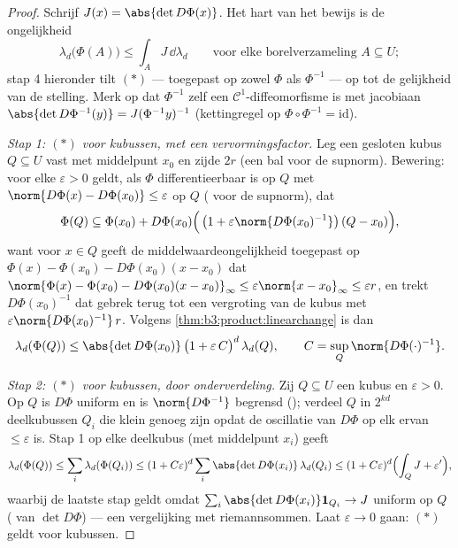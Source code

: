 \begin{proof}
Schrijf $J(x) = \abs{\det D\Phi(x)}$. Het hart van het bewijs is
de ongelijkheid
\[
\lambda_d\bigl(\Phi(A)\bigr) \leq \int_A J\,\dd\lambda_d
\qquad\text{voor elke borelverzameling } A \subseteq U;
\tag{$*$}
\]
stap 4 hieronder tilt $(*)$ --- toegepast op zowel $\Phi$ als
$\Phi^{-1}$ --- op tot de gelijkheid van de stelling. Merk op dat
$\Phi^{-1}$ zelf een $\mathcal C^1$-diffeomorfisme is met
jacobiaan $\abs{\det D\Phi^{-1}(y)} = J(\Phi^{-1}y)^{-1}$
(kettingregel op $\Phi\circ\Phi^{-1} = \mathrm{id}$).

\emph{Stap 1: $(*)$ voor kubussen, met een vervormingsfactor.} Leg
een gesloten kubus $Q \subseteq U$ vast met middelpunt $x_0$ en
zijde $2r$ (een bal voor de supnorm). Bewering: voor elke
$\varepsilon > 0$ geldt, als $\Phi$ differentieerbaar is op $Q$
met $\norm{D\Phi(x) - D\Phi(x_0)} \leq \varepsilon$ op $Q$
( voor de supnorm), dat
\[
\Phi(Q) \subseteq \Phi(x_0) + D\Phi(x_0)\Bigl(\,\bigl(1 +
\varepsilon\norm{D\Phi(x_0)^{-1}}\bigr)\,(Q - x_0)\Bigr),
\]
want voor $x \in Q$ geeft de middelwaardeongelijkheid toegepast op
$\Phi(x) - \Phi(x_0) - D\Phi(x_0)(x - x_0)$ dat $\norm{\Phi(x) -
\Phi(x_0) - D\Phi(x_0)(x-x_0)}_\infty \leq \varepsilon\norm{x -
x_0}_\infty \leq \varepsilon r$, en trekt $D\Phi(x_0)^{-1}$ dat
gebrek terug tot een vergroting van de kubus met
$\varepsilon\norm{D\Phi(x_0)^{-1}}\,r$. Volgens
\cref{thm:b3:product:linearchange} is dan
\[
\lambda_d(\Phi(Q)) \leq \abs{\det D\Phi(x_0)}\,
\bigl(1 + \varepsilon\,C\bigr)^{d}\,\lambda_d(Q),
\qquad C = \sup_{Q}\norm{D\Phi(\cdot)^{-1}} .
\]

\emph{Stap 2: $(*)$ voor  kubussen, door onderverdeling.}
Zij $Q \subseteq U$ een  kubus en $\varepsilon > 0$. Op
$Q$ is $D\Phi$ uniform  en is $\norm{D\Phi^{-1}}$ begrensd
(); verdeel $Q$ in $2^{kd}$ deelkubussen $Q_i$ die
klein genoeg zijn opdat de oscillatie van $D\Phi$ op elk ervan
$\leq \varepsilon$ is. Stap 1 op elke deelkubus (met middelpunt
$x_i$) geeft
\[
\lambda_d(\Phi(Q)) \leq \sum_i\lambda_d(\Phi(Q_i))
\leq (1 + C\varepsilon)^d \sum_i \abs{\det
D\Phi(x_i)}\,\lambda_d(Q_i)
\leq (1 + C\varepsilon)^d\Bigl(\int_Q J + \varepsilon'\Bigr),
\]
waarbij de laatste stap geldt omdat $\sum_i\abs{\det
D\Phi(x_i)}\mathbf 1_{Q_i} \to J$ uniform op $Q$ ( van
$\det D\Phi$) --- een vergelijking met riemannsommen. Laat
$\varepsilon \to 0$ gaan: $(*)$ geldt voor  kubussen.


\end{proof}
